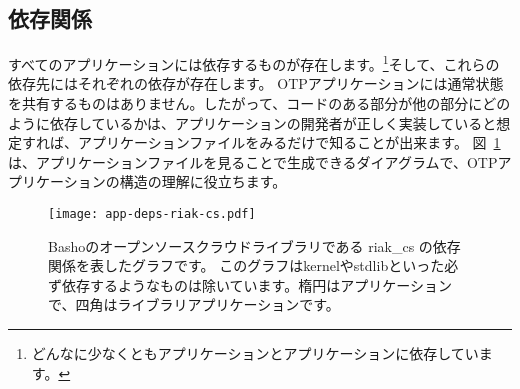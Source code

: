 \subsection{依存関係}
\label{subsec:dive-dependencies}

すべてのアプリケーションには依存するものが存在します。\footnote{どんなに少なくともアプリケーションとアプリケーションに依存しています。}そして、これらの依存先にはそれぞれの依存が存在します。
OTPアプリケーションには通常状態を共有するものはありません。したがって、コードのある部分が他の部分にどのように依存しているかは、アプリケーションの開発者が正しく実装していると想定すれば、アプリケーションファイルをみるだけで知ることが出来ます。
図~\ref{fig:app-deps}は、アプリケーションファイルを見ることで生成できるダイアグラムで、OTPアプリケーションの構造の理解に役立ちます。

\begin{figure}
  \texttt{[image: app-deps-riak-cs.pdf]}%
  \caption{Bashoのオープンソースクラウドライブラリである riak\_cs の依存関係を表したグラフです。
    このグラフはkernelやstdlibといった必ず依存するようなものは除いています。楕円はアプリケーションで、四角はライブラリアプリケーションです。}
  \label{fig:app-deps}
\end{figure}


